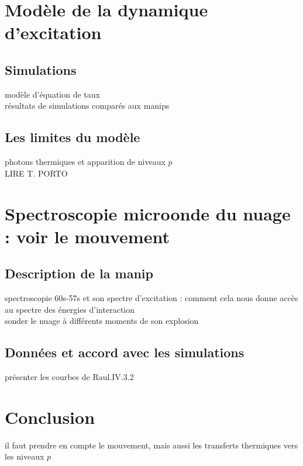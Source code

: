 \section{Modèle de la dynamique d'excitation}
	\subsection{Simulations}
		\noindent modèle d'équation de taux\\
		\noindent résultats de simulations comparés aux manips\\
	\subsection{Les limites du modèle}
		\noindent photons thermiques et apparition de niveaux $p$ \\
		LIRE T. PORTO
		
\section{Spectroscopie microonde du nuage : voir le mouvement}
	\subsection{Description de la manip}
		\noindent spectroscopie 60s-57s et son spectre d'excitation : comment cela nous donne accès au spectre des énergies d'interaction\\
		sonder le nuage à différents moments de son explosion
	\subsection{Données et accord avec les simulations}
		\noindent présenter les courbes de Raul.IV.3.2
		

\section*{Conclusion}
		\noindent il faut prendre en compte le mouvement, mais aussi les transferts thermiques vers les niveaux $p$
		
